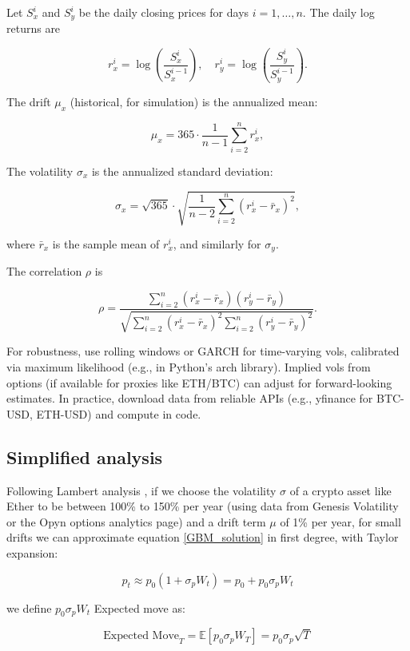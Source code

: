 \documentclass{article}
\begin{document}
Let \(S_x^i\) and \(S_y^i\) be the daily closing prices for days \(i = 1, \dots, n\). The daily log returns are

\[
r_x^i = \log\left( \frac{S_x^i}{S_x^{i-1}} \right), \quad r_y^i = \log\left( \frac{S_y^i}{S_y^{i-1}} \right).
\]

The drift \(\mu_x\) (historical, for simulation) is the annualized mean:

\[
\mu_x = 365 \cdot \frac{1}{n-1} \sum_{i=2}^n r_x^i,
\]

The volatility \(\sigma_x\) is the annualized standard deviation:

\[
\sigma_x = \sqrt{365} \cdot \sqrt{\frac{1}{n-2} \sum_{i=2}^n (r_x^i - \bar{r}_x)^2},
\]

where \(\bar{r}_x\) is the sample mean of \(r_x^i\), and similarly for \(\sigma_y\).

The correlation \(\rho\) is

\[
\rho = \frac{\sum_{i=2}^n (r_x^i - \bar{r}_x)(r_y^i - \bar{r}_y)}{\sqrt{\sum_{i=2}^n (r_x^i - \bar{r}_x)^2 \sum_{i=2}^n (r_y^i - \bar{r}_y)^2}}.
\]

For robustness, use rolling windows or GARCH for time-varying vols, calibrated via maximum likelihood (e.g., in Python's arch library). Implied vols from options (if available for proxies like ETH/BTC) can adjust for forward-looking estimates. In practice, download data from reliable APIs (e.g., yfinance for BTC-USD, ETH-USD) and compute in code.

\subsection{Simplified analysis}
 Following Lambert analysis \cite{lambert2021_optimal_liquidity}, if we choose the volatility $\sigma$ of a crypto asset like Ether to be between 100\% to 150\% per year (using data from Genesis Volatility or the Opyn options analytics page) and a drift term $\mu$ of 1\% per year, for small drifts we can approximate equation \eqref{GBM_solution} in first degree, with Taylor expansion:

 \begin{equation}
     p_t \approx p_0\left( 1+\sigma_p W_t\right)=p_0 + p_0\sigma_pW_t
 \end{equation}

 we define $p_0\sigma_pW_t$ Expected move as:

 \begin{equation}
     \text{Expected Move}_T = \mathbb{E}[p_0\sigma_pW_T]=p_0\sigma_p\sqrt{T}
 \end{equation}
\end{document}
